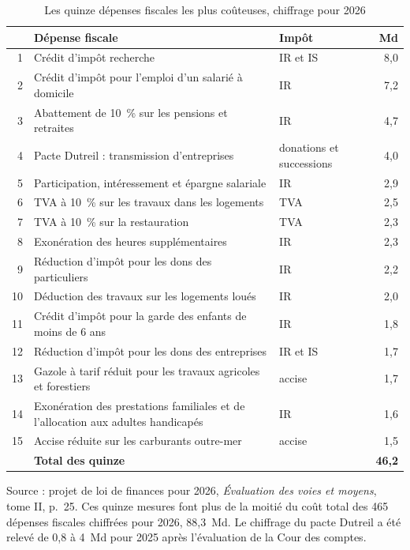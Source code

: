 \documentclass[11pt,a4paper]{article}
\providecommand{\euro}{\texteuro}
\renewcommand{\arraystretch}{1.22}
\begin{document}
\begin{table}[htbp]
\caption{Les quinze dépenses fiscales les plus coûteuses, chiffrage pour 2026}
\label{tab:niches}
\footnotesize
\renewcommand{\arraystretch}{1.18}
\begin{tabularx}{\linewidth}{@{}r>{\raggedright\arraybackslash}X l r@{}}
\toprule
 & \textbf{Dépense fiscale} & \textbf{Impôt} & \textbf{Md\euro{}}\\
\midrule
1 & Crédit d'impôt recherche & IR et IS & 8,0\\
2 & Crédit d'impôt pour l'emploi d'un salarié à domicile & IR & 7,2\\
3 & Abattement de 10~\% sur les pensions et retraites & IR & 4,7\\
4 & Pacte Dutreil : transmission d'entreprises & donations et successions & 4,0\\
5 & Participation, intéressement et épargne salariale & IR & 2,9\\
6 & TVA à 10~\% sur les travaux dans les logements & TVA & 2,5\\
7 & TVA à 10~\% sur la restauration & TVA & 2,3\\
8 & Exonération des heures supplémentaires & IR & 2,3\\
9 & Réduction d'impôt pour les dons des particuliers & IR & 2,2\\
10 & Déduction des travaux sur les logements loués & IR & 2,0\\
11 & Crédit d'impôt pour la garde des enfants de moins de 6 ans & IR & 1,8\\
12 & Réduction d'impôt pour les dons des entreprises & IR et IS & 1,7\\
13 & Gazole à tarif réduit pour les travaux agricoles et forestiers & accise & 1,7\\
14 & Exonération des prestations familiales et de l'allocation aux adultes handicapés & IR & 1,6\\
15 & Accise réduite sur les carburants outre-mer & accise & 1,5\\
\midrule
 & \textbf{Total des quinze} & & \textbf{46,2}\\
\bottomrule
\end{tabularx}

\vspace{4pt}
\parbox{\linewidth}{\raggedright\scriptsize\color{encre}Source : projet de loi de finances pour
2026, \emph{Évaluation des voies et moyens}, tome II, p.~25. Ces quinze mesures font plus de la
moitié du coût total des 465 dépenses fiscales chiffrées pour 2026, 88,3~Md\euro{}. Le chiffrage du pacte Dutreil a été relevé de
0,8 à 4~Md\euro{} pour 2025 après l'évaluation de la Cour des comptes.}
\end{table}
\end{document}
